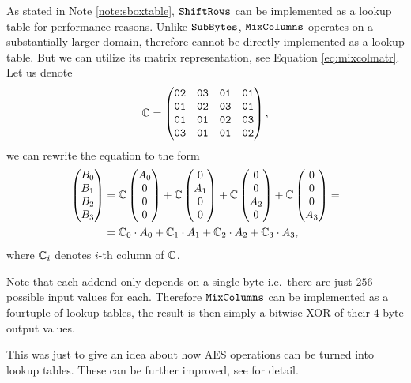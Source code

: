 As stated in Note \ref{note:sboxtable}, $\texttt{ShiftRows}$ can be implemented as a lookup table for performance reasons. Unlike $\texttt{SubBytes}$, $\texttt{MixColumns}$ operates on a substantially larger domain, therefore cannot be directly implemented as a lookup table. But we can utilize its matrix representation, see Equation \ref{eq:mixcolmatr}. Let us denote
\[
	\mathbb{C} =
	\begin{pmatrix}
		\texttt{02} & \texttt{03} & \texttt{01} & \texttt{01} \\
		\texttt{01} & \texttt{02} & \texttt{03} & \texttt{01} \\
		\texttt{01} & \texttt{01} & \texttt{02} & \texttt{03} \\
		\texttt{03} & \texttt{01} & \texttt{01} & \texttt{02}
	\end{pmatrix} ,
\]
we can rewrite the equation to the form
\begin{align*}
	\begin{pmatrix}
			B_0 \\ B_1 \\ B_2 \\ B_3
		\end{pmatrix}
		&=
		\mathbb{C}
		\begin{pmatrix}
			A_0 \\ 0 \\ 0 \\ 0
		\end{pmatrix}
		+
		\mathbb{C}
		\begin{pmatrix}
			0 \\ A_1 \\ 0 \\ 0
		\end{pmatrix}
		+
		\mathbb{C}
		\begin{pmatrix}
			0 \\ 0 \\ A_2 \\ 0
		\end{pmatrix}
		+
		\mathbb{C}
		\begin{pmatrix}
			0 \\ 0 \\ 0 \\ A_3
		\end{pmatrix}
		= \\
		&=
		\mathbb{C}_0 \cdot A_0   
		 +
		\mathbb{C}_1 \cdot A_1  
		 +
		\mathbb{C}_2 \cdot A_2 
		 +
		\mathbb{C}_3 \cdot A_3 ,
\end{align*}
where $\mathbb{C}_i$ denotes $i$-th column of $\mathbb{C}$.

Note that each addend only depends on a single byte i.e.\ there are just $256$ possible input values for each. Therefore $\texttt{MixColumns}$ can be implemented as a fourtuple of lookup tables, the result is then simply a bitwise XOR of their $4$-byte output values.

This was just to give an idea about how AES operations can be turned into lookup tables. These can be further improved, see \cite[Chapter~4]{daemen2013rijndael} for detail.
